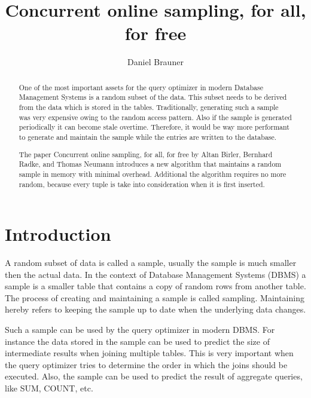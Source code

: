 \documentclass[sigconf,nonacm]{acmart}
\begin{document}
    \title{Concurrent online sampling, for all, for free}

    \author{Daniel Brauner}
    
    \begin{abstract}
        One of the most important assets for the query optimizer in modern Database Management Systems is a random subset of the data. This subset needs to be derived from the data which is stored in the tables. Traditionally, generating such a sample was very expensive owing to the random access pattern. Also if the sample is generated periodically it can become stale overtime. Therefore, it would be way more performant to generate and maintain the sample while the entries are written to the database.

        The paper Concurrent online sampling, for all, for free by Altan Birler, Bernhard Radke, and Thomas Neumann \cite{OG} introduces a new algorithm that maintains a random sample in memory with minimal overhead. Additional the algorithm requires no more random, because every tuple is take into consideration when it is first inserted.
    \end{abstract}


    \maketitle

    \section{Introduction}
        A random subset of data is called a sample, usually the sample is much smaller then the actual data. In the context of Database Management Systems (DBMS) a sample is a smaller table that contains a copy of random rows from another table. The process of creating and maintaining a sample is called sampling. Maintaining hereby refers to keeping the sample up to date when the underlying data changes.
    
        Such a sample can be used by the query optimizer in modern DBMS. For instance the data stored in the sample can be used to predict the size of intermediate results when joining multiple tables. This is very important when the query optimizer tries to determine the order in which the joins should be executed. Also, the sample can be used to predict the result of aggregate queries, like SUM, COUNT, etc. 
\end{document}
